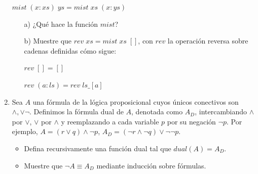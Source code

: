 \documentclass[letterpaper,11pt]{article}
\begin{document}
\begin{enumerate}
\begin{center}
        $mist \; (x : xs) \;  ys = mist \; xs \; (x : ys)$
    \end{center}

    \begin{itemize}
        \item[a)] ¿Qué hace la función $mist$?
        \item[b)] Muestre que $rev \; xs = mist \; xs \; []$, con $rev$ la 
        operación reversa sobre cadenas definidas cómo sigue: 
        \begin{center}
            $rev \; [] = []$

            $rev \; (a : ls) = rev \; ls\_[a]$
        \end{center}
    \end{itemize}

    \item Sea $A$ una fórmula de la lógica proposicional cuyos únicos 
    conectivos son $\land, \lor \neg$. Definimos la fórmula dual de $A$, 
    denotada como $A_{D}$, intercambiando $\land$ por $\lor$, $\lor$ por 
    $\land$ y reemplazando a cada variable $p$ por su negación $\neg p$.
    Por ejemplo, $A = (r \lor q) \land \neg p$, $A_{D} = (\neg r \land \neg q)
    \lor \neg \neg p$.
    \begin{itemize}
        \item Defina recursivamente una función dual tal que $dual(A) = A_{D}$.
        \item Muestre que $\neg A \equiv A_{D}$ mediante inducción sobre 
        fórmulas.
    \end{itemize}


\end{enumerate}
\end{document}
